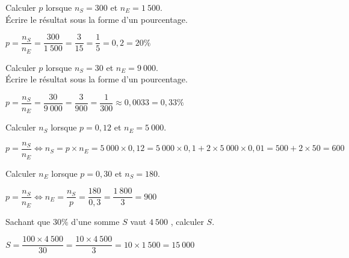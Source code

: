 \documentclass[11pt,a4paper]{article}  %
\begin{document}
\begin{enumMet}
	\item Calculer $p$ lorsque $n_S = 300$ et $n_E = 1\ 500$.\\
	Écrire le résultat sous la forme d'un pourcentage.
	\begin{corrBox}
		$p=\dfrac{n_S}{n_E}=\dfrac{300}{1\ 500}=\dfrac{3}{15}=\dfrac{1}{5}=0,2=20\%$		
	\end{corrBox}
	\item {} Calculer $p$ lorsque $n_S = 30$ et $n_E= 9\ 000$.\\
	Écrire le résultat sous la forme d'un pourcentage.
	\begin{corrBox}
		$p=\dfrac{n_S}{n_E}=\dfrac{30}{9\ 000}=\dfrac{3}{900}=\dfrac{1}{300}\approx0,0033=0,33\%$		
	\end{corrBox}
	\item Calculer $n_S$ lorsque $p = 0,12$ et $n_E= 5\ 000$.
	\begin{corrBox}
		$p=\dfrac{n_S}{n_E} \iff n_S=p\times n_E=5\ 000\times 0,12=5\ 000\times 0,1+2\times 5\ 000\times 0,01=500+2\times 50=600$		
	\end{corrBox}
	\item Calculer $n_E$ lorsque $p = 0,30$ et $n_S = 180$.
	\begin{corrBox}
		$p=\dfrac{n_S}{n_E} \iff n_E=\dfrac{n_S}{p}=\dfrac{180}{0,3}=\dfrac{1\ 800}{3}=900$		
	\end{corrBox}	
	\item Sachant que $30 \%$ d'une somme $S$ vaut $4\ 500$ \EUR{}, calculer $S$.
	\begin{corrBox}
		$S=\dfrac{100\times 4\ 500}{30}=\dfrac{10\times 4\ 500}{3}=10\times 1\ 500=15\ 000$		
	\end{corrBox}
\end{enumMet}
\end{document}
